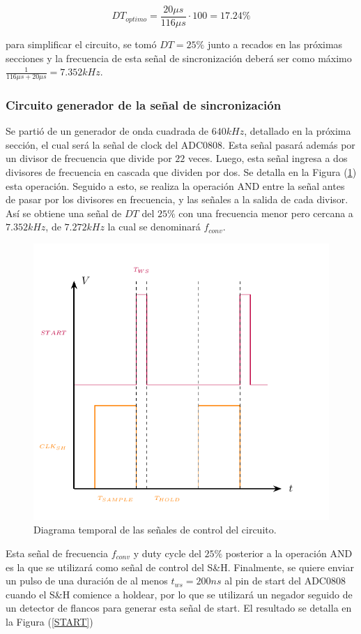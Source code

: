 \begin{equation}
DT_{optimo} = \frac{20\mu s}{116\mu s}\cdot 100 = 17.24\% 
\end{equation}

para simplificar el circuito, se tomó $DT = 25\%$ junto a recados en las próximas secciones y la frecuencia de esta señal de sincronización deberá ser como máximo $\frac{1}{116\mu s + 20\mu s} = 7.352kHz$.

\subsubsection{Circuito generador de la señal de sincronización}

Se partió de un generador de onda cuadrada de $640kHz$, detallado en la próxima sección, el cual será la señal de clock del ADC0808. Esta señal pasará además por un divisor de frecuencia que divide por $22$ veces. Luego, esta señal ingresa a dos divisores de frecuencia en cascada que dividen por dos. Se detalla en la Figura (\ref{DT}) esta operación. Seguido a esto, se realiza la operación AND entre la señal antes de pasar por los divisores en frecuencia, y las señales a la salida de cada divisor. Así se obtiene una señal de $DT$ del $25\%$ con una frecuencia menor pero cercana a $7.352kHz$, de $7.272kHz$ la cual se denominará $f_{conv}$.

\begin{figure}[H]
\centering
\includegraphics[width=0.7\linewidth, page = 2]{ImagenesEjercicio1/Graficos.pdf}
\caption{Diagrama temporal de las señales de control del circuito.}
\label{DT}
\end{figure}

Esta señal de frecuencia $f_{conv}$ y duty cycle del $25\%$ posterior a la operación AND es la que se utilizará como señal de control del S\&H. Finalmente, se quiere enviar un pulso de una duración de al menos $t_{ws} = 200ns$ al pin de start del ADC0808 cuando el S\&H comience a holdear, por lo que se utilizará un negador seguido de un detector de flancos para generar esta señal de start. El resultado se detalla en la Figura (\ref{START})

